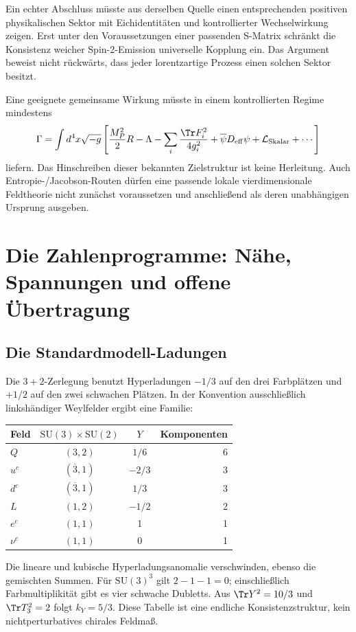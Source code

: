 Ein echter Abschluss müsste aus derselben Quelle einen entsprechenden positiven physikalischen Sektor mit Eichidentitäten und kontrollierter Wechselwirkung zeigen. Erst unter den Voraussetzungen einer passenden S-Matrix schränkt die Konsistenz weicher Spin-2-Emission universelle Kopplung ein. Das Argument beweist nicht rückwärts, dass jeder lorentzartige Prozess einen solchen Sektor besitzt.

Eine geeignete gemeinsame Wirkung müsste in einem kontrollierten Regime mindestens
\begin{equation}
\Gamma=\int d^4x\sqrt{-g}\left[
\frac{M_P^2}{2}R-\Lambda-\sum_i\frac{\Tr F_i^2}{4g_i^2}
+\overline\psi D_{\mathrm{eff}}\psi+\mathcal L_{\mathrm{Skalar}}+\cdots\right]
\end{equation}
liefern. Das Hinschreiben dieser bekannten Zielstruktur ist keine Herleitung. Auch Entropie-/Jacobson-Routen dürfen eine passende lokale vierdimensionale Feldtheorie nicht zunächst voraussetzen und anschließend als deren unabhängigen Ursprung ausgeben.

\chapter{Die Zahlenprogramme: Nähe, Spannungen und offene Übertragung}
\label{ch:zahlen}
\section{Die Standardmodell-Ladungen}
Die $3+2$-Zerlegung benutzt Hyperladungen $-1/3$ auf den drei Farbplätzen und $+1/2$ auf den zwei schwachen Plätzen. In der Konvention ausschließlich linkshändiger Weylfelder ergibt eine Familie:
\begin{center}
\begin{tabular}{lccr}
\toprule Feld&$\mathrm{SU}(3)\times\mathrm{SU}(2)$&$Y$&Komponenten\\\midrule
$Q$&$(3,2)$&$1/6$&6\\
$u^c$&$(\overline3,1)$&$-2/3$&3\\
$d^c$&$(\overline3,1)$&$1/3$&3\\
$L$&$(1,2)$&$-1/2$&2\\
$e^c$&$(1,1)$&1&1\\
$\nu^c$&$(1,1)$&0&1\\\bottomrule
\end{tabular}
\end{center}
Die lineare und kubische Hyperladungsanomalie verschwinden, ebenso die gemischten Summen. Für $\mathrm{SU}(3)^3$ gilt $2-1-1=0$; einschließlich Farbmultiplikität gibt es vier schwache Dubletts. Aus $\Tr Y^2=10/3$ und $\Tr T_3^2=2$ folgt $k_Y=5/3$. Diese Tabelle ist eine endliche Konsistenzstruktur, kein nichtperturbatives chirales Feldmaß. 

